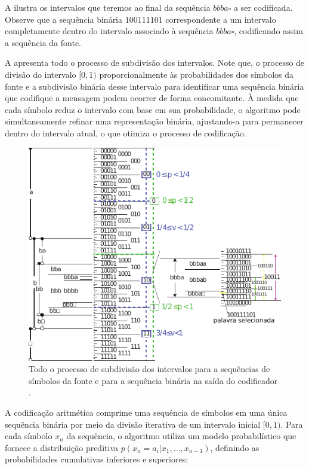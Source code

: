 \begin{example}
A  ilustra os intervalos que teremos ao final da sequência $bbba\square$
a ser codificada. Observe que a sequência binária $100111101$ correspondente a um
intervalo completamente dentro do intervalo associado à sequência $bbba\square$,
codificando assim a sequência da fonte.

A  apresenta todo o processo de subdivisão dos intervalos.
Note que, o processo de divisão do intervalo $[0,1)$ proporcionalmente às
probabilidades dos símbolos da fonte e a subdivisão binária desse intervalo
para identificar uma sequência binária que codifique a mensagem podem ocorrer
de forma concomitante. À medida que cada símbolo reduz o intervalo com base em
sua probabilidade, o algoritmo pode simultaneamente refinar uma representação
binária, ajustando-a para permanecer dentro do intervalo atual, o que otimiza o
processo de codificação.


\begin{figure}[h!]
\centering
\includegraphics[width=\textwidth]{figures/bbbaall.pdf}
\caption{Todo o processo de subdivisão dos intervalos para a sequências de símbolos da fonte e para a sequência binária na saída do codificador \parencite{mackay2003}.}
\label{fig:bbbaall}
\end{figure}

\end{example}



A codificação aritmética comprime uma sequência de símbolos em uma única
sequência binária por meio da divisão iterativa de um intervalo inicial $[0,1)$. 
Para cada símbolo $x_n$ da sequência, o algoritmo utiliza um modelo
probabilístico que fornece a distribuição preditiva $p(x_n = a_i | x_1, \ldots, x_{n-1})$, 
definindo as probabilidades cumulativas inferiores e superiores:

